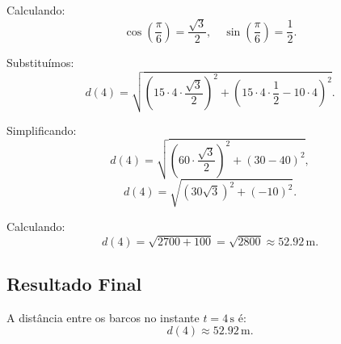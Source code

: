 Calculando:
\[
\cos\left(\frac{\pi}{6}\right) = \frac{\sqrt{3}}{2}, \quad \sin\left(\frac{\pi}{6}\right) = \frac{1}{2}.
\]

Substituímos:
\[
d(4) = \sqrt{\left(15 \cdot 4 \cdot \frac{\sqrt{3}}{2}\right)^2 + \left(15 \cdot 4 \cdot \frac{1}{2} - 10 \cdot 4\right)^2}.
\]

Simplificando:
\[
d(4) = \sqrt{\left(60 \cdot \frac{\sqrt{3}}{2}\right)^2 + \left(30 - 40\right)^2},
\]
\[
d(4) = \sqrt{\left(30\sqrt{3}\right)^2 + (-10)^2}.
\]

Calculando:
\[
d(4) = \sqrt{2700 + 100} = \sqrt{2800} \approx 52.92 \, \text{m}.
\]

\subsection*{Resultado Final}
A distância entre os barcos no instante \(t = 4 \, \text{s}\) é:
\[
d(4) \approx 52.92 \, \text{m}.
\]
